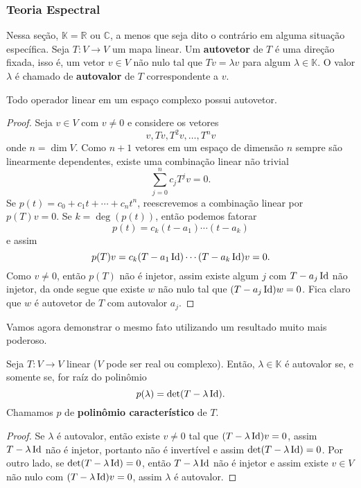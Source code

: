 \subsubsection*{Teoria Espectral}

Nessa seção, $\mathbb{K} = \mathbb{R}$ ou $\mathbb{C}$, a menos que seja dito o contrário em alguma situação específica. Seja $T \colon V \to V$ um mapa linear. Um \textbf{autovetor} de $T$ é uma direção fixada, isso é, um vetor $v \in V$ não nulo tal que $Tv = \lambda v$ para algum $\lambda \in \mathbb{K}$. O valor $\lambda$ é chamado de \textbf{autovalor} de $T$ correspondente a $v$.

\begin{proposition}
    Todo operador linear em um espaço complexo possui autovetor.
\end{proposition}
\begin{proof}
    Seja $v \in V$ com $v \neq 0$ e considere os vetores \begin{equation}
        v, Tv, T^2v, \dots, T^nv
    \end{equation} onde $n = \dim V$. Como $n+1$ vetores em um espaço de dimensão $n$ sempre são linearmente dependentes, existe uma combinação linear não trivial \begin{equation}
        \sum_{j = 0}^n c_j T^j v = 0.
    \end{equation} Se $p(t) = c_0 + c_1 t + \cdots + c_n t^n$, reescrevemos a combinação linear por $p(T)v = 0$. Se $k = \deg(p(t))$, então podemos fatorar \begin{equation}
        p(t) = c_k (t - a_1) \cdots (t - a_k)
    \end{equation} e assim \begin{equation}
        p(T)v = c_k (T - a_1\operatorname{Id}) \cdots (T - a_k\operatorname{Id})v = 0.
    \end{equation} Como $v \neq 0$, então $p(T)$ não é injetor, assim existe algum $j$ com $T - a_j\operatorname{Id}$ não injetor, da onde segue que existe $w$ não nulo tal que $(T - a_j\operatorname{Id})w = 0$. Fica claro que $w$ é autovetor de $T$ com autovalor $a_j$.
\end{proof}

Vamos agora demonstrar o mesmo fato utilizando um resultado muito mais poderoso.

\begin{proposition}
    Seja $T \colon V \to V$ linear ($V$ pode ser real ou complexo). Então, $\lambda \in \mathbb{K}$ é autovalor se, e somente se, for raíz do polinômio \begin{equation}
        p(\lambda) = \det(T - \lambda\operatorname{Id}).
    \end{equation} Chamamos $p$ de \textbf{polinômio característico} de $T$.
\end{proposition}
\begin{proof}
    Se $\lambda$ é autovalor, então existe $v \neq 0$ tal que $(T - \lambda \operatorname{Id})v = 0$, assim $T - \lambda \operatorname{Id}$ não é injetor, portanto não é invertível e assim $\det(T - \lambda \operatorname{Id}) = 0$. Por outro lado, se $\det(T - \lambda\operatorname{Id}) = 0$, então $T - \lambda \operatorname{Id}$ não é injetor e assim existe $v \in V$ não nulo com $(T - \lambda \operatorname{Id})v = 0$, assim $\lambda$ é autovalor.
\end{proof}


